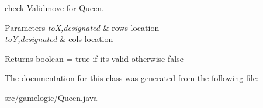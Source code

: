 check Validmove for \mbox{\hyperlink{classgamelogic_1_1_queen}{Queen}}. 
\begin{DoxyParams}{Parameters}
{\em toX,designated} & row\textquotesingle{}s location \\
\hline
{\em toY,designated} & col\textquotesingle{}s location \\
\hline
\end{DoxyParams}
\begin{DoxyReturn}{Returns}
boolean = true if it\textquotesingle{}s valid otherwise false 
\end{DoxyReturn}


The documentation for this class was generated from the following file\+:\begin{DoxyCompactItemize}
\item 
src/gamelogic/Queen.\+java\end{DoxyCompactItemize}
